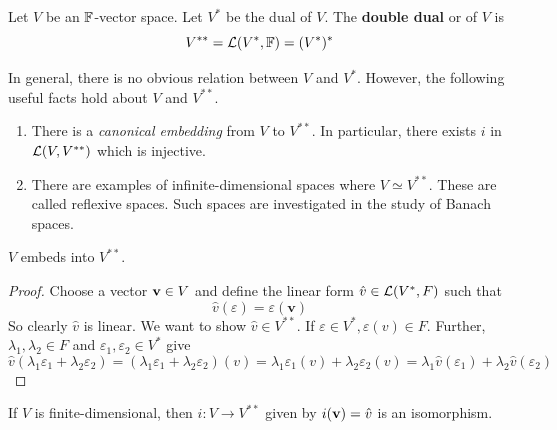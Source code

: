 \documentclass[a4paper]{article}
\begin{document}
\begin{definition}
	Let $ V $ be an $ {\mathbb{F}} $-vector space.
	Let $ V^* $ be the dual of $ V $.
	The \textbf{double dual} or  of $ V $ is
	\[
		V^{* *} = {\mathcal{L}}(V^*, {\mathbb{F}}) = (V^*)^*
	\]
\end{definition}
\begin{remark}
	In general, there is no obvious relation between $ V $ and $ V^* $.
	However, the following useful facts hold about $ V $ and $ V^{* *} $.
	\begin{enumerate}
		\item There is a \textit{canonical embedding} from $ V $ to $ V^{* *} $.
		      In particular, there exists $ i $ in $ {\mathcal{L}}(V, V^{* *}) $ which is injective.
		\item There are examples of infinite-dimensional spaces where $ V \simeq V^{* *} $.
		      These are called reflexive spaces.
		      Such spaces are investigated in the study of Banach spaces.
	\end{enumerate}
\end{remark}
\begin{theorem}
	$ V $ embeds into $ V^{* *} $.
\end{theorem}
\begin{proof}
	Choose a vector $ {\bf v} \in V $ and define the linear form $ \hat v \in {\mathcal{L}}(V^*, F) $ such that
	\[
		\hat v(\varepsilon) = \varepsilon(\mathbf{v})
	\]
	So clearly $ \hat v $ is linear.
	We want to show $ \hat v \in V^{* *} $.
	If $ \varepsilon \in V^*, \varepsilon(v) \in F $.
	Further, $ \lambda_1, \lambda_2 \in F $ and $ \varepsilon_1, \varepsilon_2 \in V^* $ give
	\[
		\hat v (\lambda_1 \varepsilon_1 + \lambda_2 \varepsilon_2) = (\lambda_1 \varepsilon_1 + \lambda_2 \varepsilon_2)(v) = \lambda_1 \varepsilon_1(v) + \lambda_2 \varepsilon_2(v) = \lambda_1 \hat v(\varepsilon_1) + \lambda_2 \hat v(\varepsilon_2)
	\]
\end{proof}
\begin{theorem}
	If $ V $ is finite-dimensional, then $ i \colon V \to V^{* *} $ given by $ i({\bf v}) = \hat v $ is an isomorphism.
\end{theorem}
\end{document}
